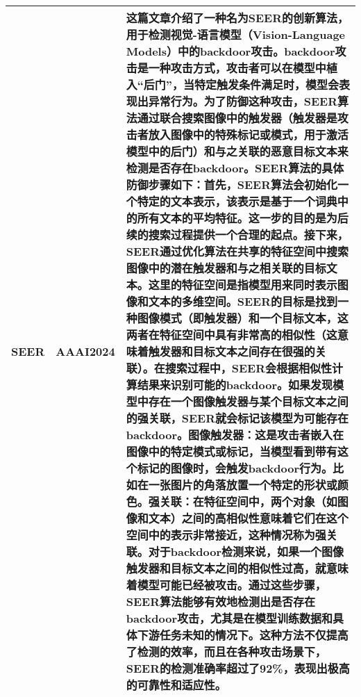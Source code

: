 \documentclass[lettersize,journal]{IEEEtran}
\begin{document}
\begin{longtable}{|p{3.5cm}|p{2cm}|p{10.5cm}|}
    SEER\cite{defense01} & AAAI2024 & 这篇文章介绍了一种名为SEER的创新算法，用于检测视觉-语言模型（Vision-Language Models）中的backdoor攻击。backdoor攻击是一种攻击方式，攻击者可以在模型中植入“后门”，当特定触发条件满足时，模型会表现出异常行为。为了防御这种攻击，SEER算法通过联合搜索图像中的触发器（触发器是攻击者放入图像中的特殊标记或模式，用于激活模型中的后门）和与之关联的恶意目标文本来检测是否存在backdoor。SEER算法的具体防御步骤如下：首先，SEER算法会初始化一个特定的文本表示，该表示是基于一个词典中的所有文本的平均特征。这一步的目的是为后续的搜索过程提供一个合理的起点。接下来，SEER通过优化算法在共享的特征空间中搜索图像中的潜在触发器和与之相关联的目标文本。这里的特征空间是指模型用来同时表示图像和文本的多维空间。SEER的目标是找到一种图像模式（即触发器）和一个目标文本，这两者在特征空间中具有非常高的相似性（这意味着触发器和目标文本之间存在很强的关联）。在搜索过程中，SEER会根据相似性计算结果来识别可能的backdoor。如果发现模型中存在一个图像触发器与某个目标文本之间的强关联，SEER就会标记该模型为可能存在backdoor。图像触发器：这是攻击者嵌入在图像中的特定模式或标记，当模型看到带有这个标记的图像时，会触发backdoor行为。比如在一张图片的角落放置一个特定的形状或颜色。强关联：在特征空间中，两个对象（如图像和文本）之间的高相似性意味着它们在这个空间中的表示非常接近，这种情况称为强关联。对于backdoor检测来说，如果一个图像触发器和目标文本之间的相似性过高，就意味着模型可能已经被攻击。通过这些步骤，SEER算法能够有效地检测出是否存在backdoor攻击，尤其是在模型训练数据和具体下游任务未知的情况下。这种方法不仅提高了检测的效率，而且在各种攻击场景下，SEER的检测准确率超过了92\%，表现出极高的可靠性和适应性。 \\ \hline

\end{longtable}
\end{document}

